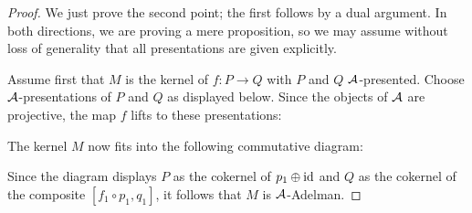 \begin{proof}
  We just prove the second point; the first follows by a dual argument. In both directions, we are proving a mere proposition, so we may assume without loss of generality that all presentations are given explicitly.

  Assume first that $M$ is the kernel of $f : P \to Q$ with $P$ and $Q$ $\mathcal{A}$-presented.
  Choose $\mathcal{A}$-presentations of $P$ and $Q$ as displayed below.
  Since the objects of $\mathcal{A}$ are projective, the map $f$ lifts to these presentations:
  \begin{center}
  \end{center}
  The kernel $M$ now fits into the following commutative diagram:
  \begin{center}
  \end{center}
  Since the diagram displays $P$ as the cokernel of $p_1 \oplus \mathrm{id}$ and
  $Q$ as the cokernel of the composite $[f_1 \circ p_1, q_1]$,
  it follows that $M$ is $\mathcal{A}$-Adelman.


\end{proof}
